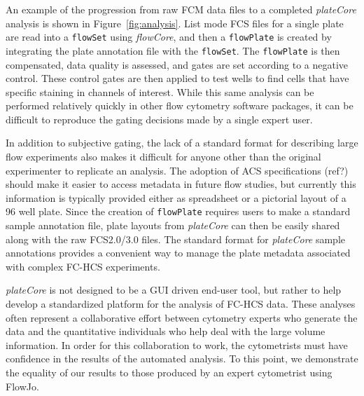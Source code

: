 \documentclass[12pt]{article}
\newcommand{\Robject}[1]{{\texttt{#1}}}
\newcommand{\Rpackage}[1]{{\textit{#1}}}
\begin{document}
An example of the progression from raw FCM data files to a completed \Rpackage{plateCore} analysis is shown in Figure~\ref{fig:analysis}.
List mode FCS files for a single plate are read into a \Robject{flowSet} using \Rpackage{flowCore}, and then a \Robject{flowPlate} is created by integrating
the plate annotation file with the \Robject{flowSet}. The \Robject{flowPlate} is then compensated, data quality is assessed, and gates
are set according to a negative control. These control gates are then applied to test wells to find cells that have specific staining
in channels of interest. While this same analysis can be performed relatively quickly in 
other flow cytometry software packages, it can be difficult to reproduce the gating decisions made by a single expert user.

In addition to subjective gating, the lack of a standard format for describing large flow experiments also
makes it difficult for anyone other than the original experimenter to replicate an analysis. 
The adoption of ACS specifications (ref?) should make it easier to access metadata in future flow studies, but currently
this information is typically provided either as spreadsheet or a pictorial layout of a 96 well plate. 
Since the creation of \Robject{flowPlate} requires users to make a standard sample annotation file, plate layouts from \Rpackage{plateCore}
can then be easily shared along with the raw FCS2.0/3.0 files. 
The standard format for \Rpackage{plateCore} sample annotations provides a convenient way to manage the plate metadata
associated with complex FC-HCS experiments.

\Rpackage{plateCore} is not designed to be a GUI driven end-user tool, but rather to help develop a standardized platform for the analysis of FC-HCS data.
These analyses often represent a collaborative effort between cytometry experts who generate the data and the quantitative individuals who help
deal with the large volume information. In order for this collaboration to work, the cytometrists must have confidence in the
results of the automated analysis. To this point, we demonstrate the equality of our results to those produced by an expert
cytometrist using FlowJo\texttrademark.
\end{document}

